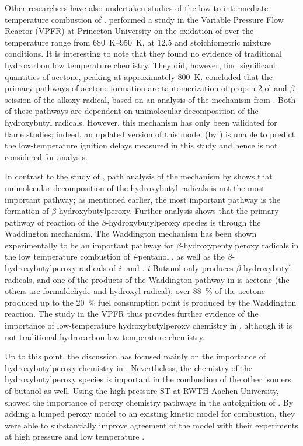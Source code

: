 \documentclass[../main.tex]{subfiles}
\begin{document}
Other researchers have also undertaken studies of the low to intermediate
temperature combustion of \tBuOH{}. \textcite{Lefkowitz2012}
performed a study in the Variable Pressure Flow Reactor (VPFR) at Princeton
University on the oxidation of \tBuOH{} over the temperature range
from \SIrange{680}{950}{\kelvin}, at \SI{12.5}{\atmosphere} and stoichiometric mixture conditions. It is
interesting to note that they found no evidence of traditional hydrocarbon
low temperature chemistry. They did, however, find significant quantities of
acetone, peaking at approximately \SI{800}{\kelvin}. \textcite{Lefkowitz2012} concluded
that the primary pathways of acetone formation are tautomerization of
propen-2-ol and $\beta$-scission of the alkoxy radical, based on an analysis
of the mechanism from \textcite{Grana2010}. Both of these pathways are
dependent on unimolecular decomposition of the hydroxybutyl radicals. However,
this mechanism has only been validated for flame studies; indeed, an updated
version of this model (by \textcite{Frassoldati2012}) is unable to predict the
low-temperature ignition delays measured in this study and hence is not
considered for analysis.

In contrast to the study of \textcite{Lefkowitz2012}, path analysis of the
mechanism by \textcite{Sarathy2012} shows that unimolecular decomposition
of the hydroxybutyl radicals is not the most important pathway; as mentioned
earlier, the most important pathway is the formation of
$\beta$-hydroxybutylperoxy. Further analysis shows that the primary pathway of
reaction of the \tBuOH{} $\beta$-hydroxybutylperoxy species is
through the Waddington mechanism. The Waddington mechanism has been shown
experimentally to be an important pathway for $\beta$-hydroxypentylperoxy
radicals in the low temperature combustion of \textit{i}-pentanol
\cite{Welz2012}, as well as the $\beta$-hydroxybutylperoxy radicals of
\textit{i}- and \tBuOH{} \cite{Welz2013b}. \textit{t}-Butanol only
produces $\beta$-hydroxybutyl radicals, and one of the products of the
Waddington pathway in \tBuOH{} is acetone (the others are
formaldehyde and hydroxyl radical); over \SI{88}{\percent} of the acetone produced up to the
\SI{20}{\percent} fuel consumption point is produced by the Waddington reaction. The study
in the VPFR thus provides further evidence of the importance of low-temperature
hydroxybutylperoxy chemistry in \tBuOH{}, although it is not
traditional hydrocarbon low-temperature chemistry.

Up to this point, the discussion has focused mainly on the importance of
hydroxybutylperoxy chemistry in \tBuOH{}. Nevertheless, the chemistry
of the hydroxybutylperoxy species is important in the combustion of the other
isomers of butanol as well. Using the high pressure ST at RWTH Aachen
University, \textcite{Vranckx2011} showed the importance of peroxy chemistry
pathways in the autoignition of \nBuOH{}. By adding a lumped peroxy
model to an existing kinetic model for \nBuOH{} combustion, they were
able to substantially improve agreement of the model with their experiments at
high pressure and low temperature \cite{Vranckx2011}.
\end{document}
